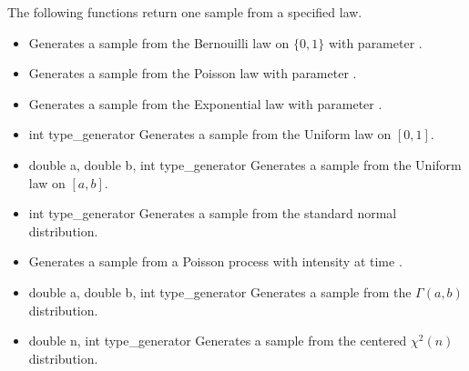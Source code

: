 The following functions return one sample from a specified law.
\begin{itemize}
\item {}
  \sshortdescribe Generates a sample from the Bernouilli law on $\{0, 1\}$ with
  parameter .
  
\item {}
  \sshortdescribe Generates a sample from the Poisson law with
  parameter .

\item {}
  \sshortdescribe Generates a sample from the Exponential law with
  parameter .

\item {} {int type_generator}
  \sshortdescribe Generates a sample from the Uniform law on $[0, 1]$.

\item {} {double a, double b, int
    type_generator}
  \sshortdescribe Generates a sample from the Uniform law on $[a, b]$.

\item {} {int type_generator}
  \sshortdescribe Generates a sample from the standard normal distribution.

\item {}
  \sshortdescribe Generates a sample from a Poisson process with intensity
   at time .

\item {} {double a, double b, int type_generator}
  \sshortdescribe Generates a sample from the $\Gamma(a, b)$ distribution.  
  
\item {} {double n, int type_generator}
  \sshortdescribe Generates a sample from the centered $\chi^2(n)$ distribution.
\end{itemize}

